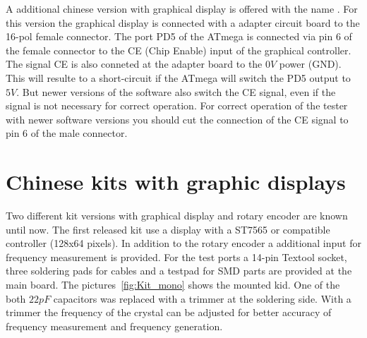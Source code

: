 A additional chinese version with graphical display is offered with the name .
For this version the graphical display is connected with a adapter circuit board to the 16-pol female connector. 
The port PD5 of the ATmega is connected via pin 6 of the female connector to the CE (Chip Enable) input of the 
graphical controller.
The signal CE is also conneted at the adapter board to the \(0V\) power (GND).
This will resulte to a short-circuit if the ATmega will switch the PD5 output to \(5V\).
But newer versions of the software also switch the CE signal, even if the signal is not necessary for
correct operation.
For correct operation of the  tester with newer software versions you should cut the
connection of the CE signal to pin 6 of the male connector.

\section{Chinese kits with graphic displays}

Two different kit versions with graphical display and rotary encoder are known until now.
The first released kit use a display with a ST7565 or compatible controller (128x64 pixels).
In addition to the rotary encoder a additional input for frequency measurement is provided.
For the test ports a 14-pin Textool socket, three soldering pads for cables and a testpad
for SMD parts are provided at the main board.
The pictures~\ref{fig:Kit_mono} shows the mounted kid.
One of the both \(22 pF\) capacitors was replaced with a trimmer at the soldering side.
With a trimmer the frequency of the crystal can be adjusted for better accuracy of frequency measurement
and frequency generation. 

